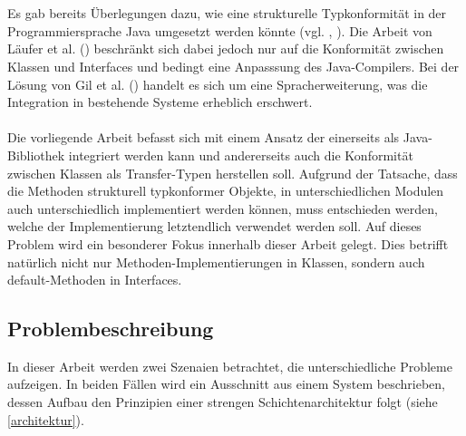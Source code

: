 \documentclass[11pt, 
ngerman,
doublespacing,
chapterinoneline, %
consistentlayout, %
]{scrartcl}
\begin{document}
\\\\
Es gab bereits Überlegungen dazu, wie eine strukturelle Typkonformität in der Program\-mier\-sprache Java umgesetzt werden könnte (vgl. \cite{whiteoak}, \cite{structconfjava}). Die Arbeit von Läufer et al. (\cite{structconfjava}) beschränkt sich dabei jedoch nur auf die Konformität zwischen Klassen und Interfaces und bedingt eine Anpasssung des Java-Compilers. Bei der Lösung von Gil et al. (\cite{whiteoak}) handelt es sich um eine Spracherweiterung, was die Integration in bestehende Systeme erheblich erschwert.
\\\\ 
Die vorliegende Arbeit befasst sich mit einem Ansatz der einerseits als Java-Bibliothek integriert werden kann und andererseits auch die Konformität zwischen Klassen als Transfer-Typen herstellen soll. 
Aufgrund der Tatsache, dass die Methoden strukturell typkonformer Objekte, in unterschiedlichen Modulen auch unterschiedlich implementiert werden können, muss entschieden werden, welche der Implementierung letztendlich ver\-wendet werden soll. Auf dieses Problem wird ein besonderer Fokus innerhalb dieser Arbeit gelegt.
Dies betrifft natürlich nicht nur Methoden-Implementierungen in Klassen, sondern auch default-Methoden in Interfaces.

\subsection{Problembeschreibung}\label{problembeschreibung}
In dieser Arbeit werden zwei Szenaien betrachtet, die unterschiedliche Probleme aufzeigen. In beiden Fällen wird ein Ausschnitt aus einem System beschrieben, dessen Aufbau den Prinzipien einer strengen Schichtenarchitektur folgt  (siehe \ref{architektur}).
\end{document}
